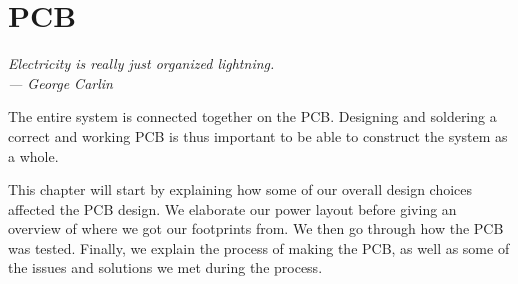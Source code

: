 \chapter{PCB}\label{ch:pcb}

\begin{flushright}{\slshape
    Electricity is really just organized lightning.\\ \medskip
    --- George Carlin}
\end{flushright}

The entire system is connected together on the PCB. Designing and soldering
a correct and working PCB is thus important to be able to construct the system
as a whole.

This chapter will start by explaining how some of our overall design choices
affected the PCB design. We elaborate our power layout before giving an
overview of where we got our footprints from. We then go through how the PCB was
tested. Finally, we explain the process of making the PCB, as well as some of
the issues and solutions we met during the process.



%



%



